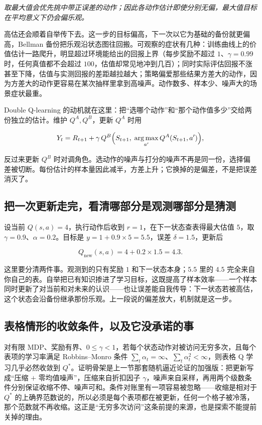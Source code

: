 \emph{取最大值会优先挑中带正误差的动作；因此各动作估计即使分别无偏，最大值目标在平均意义下仍会偏乐观。}

高估还会顺着自举传下去。这一步的目标偏高，下一次以它为基础的备份就更偏高，Bellman 备份把乐观沿状态图往回搬。可观察的症状有几种：训练曲线上的价值估计一路爬升，明显超过环境能给出的回报上界（每步奖励不超过 \(1\)、\(\gamma=0.99\) 时，任何真值都不会超过 \(100\)，估值却常见地冲到几百）；同时实际评估回报不涨甚至下降，估值与实测回报的差距越拉越大；策略偏爱那些结果方差大的动作，因为方差大的动作更容易在某次抽样里拿到高噪声。动作数多、样本少、噪声大的场景症状最重。

Double Q-learning 的动机就在这里：把``选哪个动作''和``那个动作值多少''交给两份独立的估计。维护 \(Q^A,Q^B\)，更新 \(Q^A\) 时用

\[
Y_t=R_{t+1}+\gamma\,Q^B\Bigl(S_{t+1},\;\operatorname*{arg\,max}_{a'}Q^A(S_{t+1},a')\Bigr),
\]

反过来更新 \(Q^B\) 时对调角色。选动作的噪声与打分的噪声不再是同一份，选择偏差被切断。每份估计的样本量因此减半，方差上升；它换掉的是偏差，不是把误差消灭了。

\subsection{把一次更新走完，看清哪部分是观测哪部分是猜测}

设当前 \(Q(s,a)=4\)，执行动作后收到 \(r=1\)，在下一状态查表得最大估值 \(5\)，取 \(\gamma=0.9\)、\(\alpha=0.2\)。目标是 \(y=1+0.9\times 5=5.5\)，误差 \(\delta=1.5\)，更新后

\[
Q_{\mathrm{new}}(s,a)=4+0.2\times 1.5=4.3.
\]

这里要分清两件事。观测到的只有奖励 \(1\) 和下一状态本身；\(5.5\) 里的 \(4.5\) 完全来自你自己的表。自举把已有知识掺进了学习目标，这既提高了样本效率——一个样本同时更新了对当前和对未来的认识——也让误差能自我传导：下一状态若被高估，这个状态会沿备份继承那份乐观。上一段说的偏差放大，机制就是这一步。

\subsection{表格情形的收敛条件，以及它没承诺的事}

对有限 MDP、奖励有界、\(0\le\gamma<1\)，若每个状态动作对被访问无穷多次，且每个表项的学习率满足 Robbins--Monro 条件 \(\sum_t\alpha_t=\infty\)、\(\sum_t\alpha_t^2<\infty\)，则表格 Q 学习几乎必然收敛到 \(Q^*\)。证明骨架是上一节那套随机逼近论证的加强版：把更新写成``压缩 \(+\) 零均值噪声''，压缩来自折扣因子 \(\gamma\)，噪声来自采样，再用两个级数条件分别保证收缩不停、噪声可和。条件对账里有一项容易被忽略——收缩是相对于 \(Q^*\) 的上确界范数说的，所以必须是每个表项都在被更新，任何一个格子被冷落，那个范数就不再收缩。这正是``无穷多次访问''这条前提的来源，也是探索不能提前关掉的理由。

